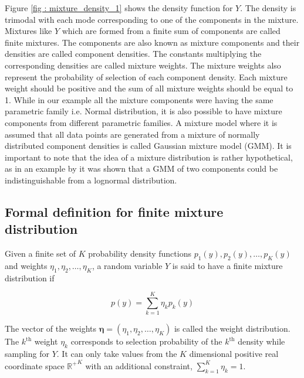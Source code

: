 Figure \ref{fig : mixture_density_1} shows the density function for $Y$. The density is trimodal with each mode corresponding to one of the components in the mixture. Mixtures like $Y$ which are formed from a finite sum of components are called finite mixtures. The components are also known as mixture components and their densities are called component densities. The constants multiplying the corresponding densities are called mixture weights. The mixture weights also represent the probability of selection of each component density. Each mixture weight should be positive and the sum of all mixture weights should be equal to 1. While in our example all the  mixture components were having the same parametric family i.e. Normal distribution, it is also possible to have mixture components from different parametric families. A mixture model where it is assumed that all data points are generated from a mixture of normally distributed component densities is called Gaussian mixture model (GMM). It is important to note that the idea of a mixture distribution is rather hypothetical, as in an example by \citet{titterington_statistical_1986} it was shown that a GMM of two components could be indistinguishable from a lognormal distribution.

\subsection{Formal definition for finite mixture distribution}
\label{subsec : formal_def_mixture_dist}
Given a finite set of $K$ probability density functions $p_1(y), p_2(y), \ldots, p_K(y)$ and weights $\eta_1, \eta_2, \ldots, \eta_K$, a random variable $Y$ is said to have a finite mixture distribution if

$$p(y) = \sum_{k=1}^{K} \eta_{k} p_{k}(y)$$

The vector of the weights $\boldsymbol{\eta} = (\eta_1, \eta_2, \ldots, \eta_K)$ is called the weight distribution. The $k^\text{th}$ weight $\eta_{k}$ corresponds to selection probability of the $k^\text{th}$ density while sampling for $Y$. It can only take values from the $K$ dimensional positive real coordinate space ${\mathbb{R}^{+}}^K$ with an additional constraint, $\sum_{k=1}^{K} \eta_{k} = 1$.\\

